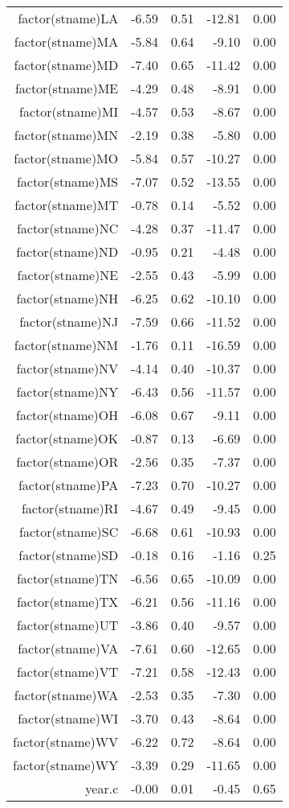 \begin{table}[ht]
\begin{tabular}{rrrrr}
  factor(stname)LA & -6.59 & 0.51 & -12.81 & 0.00 \\ 
  factor(stname)MA & -5.84 & 0.64 & -9.10 & 0.00 \\ 
  factor(stname)MD & -7.40 & 0.65 & -11.42 & 0.00 \\ 
  factor(stname)ME & -4.29 & 0.48 & -8.91 & 0.00 \\ 
  factor(stname)MI & -4.57 & 0.53 & -8.67 & 0.00 \\ 
  factor(stname)MN & -2.19 & 0.38 & -5.80 & 0.00 \\ 
  factor(stname)MO & -5.84 & 0.57 & -10.27 & 0.00 \\ 
  factor(stname)MS & -7.07 & 0.52 & -13.55 & 0.00 \\ 
  factor(stname)MT & -0.78 & 0.14 & -5.52 & 0.00 \\ 
  factor(stname)NC & -4.28 & 0.37 & -11.47 & 0.00 \\ 
  factor(stname)ND & -0.95 & 0.21 & -4.48 & 0.00 \\ 
  factor(stname)NE & -2.55 & 0.43 & -5.99 & 0.00 \\ 
  factor(stname)NH & -6.25 & 0.62 & -10.10 & 0.00 \\ 
  factor(stname)NJ & -7.59 & 0.66 & -11.52 & 0.00 \\ 
  factor(stname)NM & -1.76 & 0.11 & -16.59 & 0.00 \\ 
  factor(stname)NV & -4.14 & 0.40 & -10.37 & 0.00 \\ 
  factor(stname)NY & -6.43 & 0.56 & -11.57 & 0.00 \\ 
  factor(stname)OH & -6.08 & 0.67 & -9.11 & 0.00 \\ 
  factor(stname)OK & -0.87 & 0.13 & -6.69 & 0.00 \\ 
  factor(stname)OR & -2.56 & 0.35 & -7.37 & 0.00 \\ 
  factor(stname)PA & -7.23 & 0.70 & -10.27 & 0.00 \\ 
  factor(stname)RI & -4.67 & 0.49 & -9.45 & 0.00 \\ 
  factor(stname)SC & -6.68 & 0.61 & -10.93 & 0.00 \\ 
  factor(stname)SD & -0.18 & 0.16 & -1.16 & 0.25 \\ 
  factor(stname)TN & -6.56 & 0.65 & -10.09 & 0.00 \\ 
  factor(stname)TX & -6.21 & 0.56 & -11.16 & 0.00 \\ 
  factor(stname)UT & -3.86 & 0.40 & -9.57 & 0.00 \\ 
  factor(stname)VA & -7.61 & 0.60 & -12.65 & 0.00 \\ 
  factor(stname)VT & -7.21 & 0.58 & -12.43 & 0.00 \\ 
  factor(stname)WA & -2.53 & 0.35 & -7.30 & 0.00 \\ 
  factor(stname)WI & -3.70 & 0.43 & -8.64 & 0.00 \\ 
  factor(stname)WV & -6.22 & 0.72 & -8.64 & 0.00 \\ 
  factor(stname)WY & -3.39 & 0.29 & -11.65 & 0.00 \\ 
  year.c & -0.00 & 0.01 & -0.45 & 0.65 \\ 
   \hline
\end{tabular}
\end{table}
